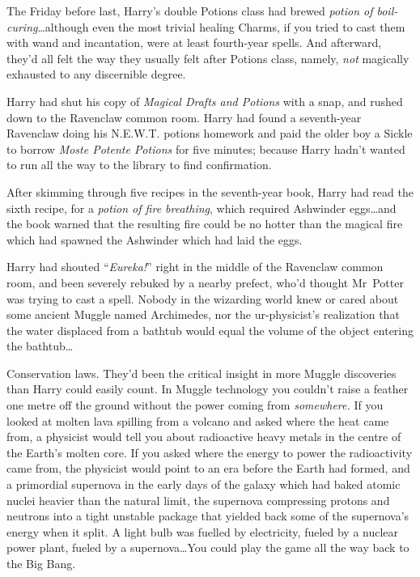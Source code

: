 The Friday before last, Harry’s double Potions class had brewed \emph{potion of boil-curing}…although even the most trivial healing Charms, if you tried to cast them with wand and incantation, were at least fourth-year spells. And afterward, they’d all felt the way they usually felt after Potions class, namely, \emph{not} magically exhausted to any discernible degree.

Harry had shut his copy of \emph{Magical Drafts and Potions} with a snap, and rushed down to the Ravenclaw common room. Harry had found a seventh-year Ravenclaw doing his N.E.W.T. potions homework and paid the older boy a Sickle to borrow \emph{Moste Potente Potions} for five minutes; because Harry hadn’t wanted to run all the way to the library to find confirmation.

After skimming through five recipes in the seventh-year book, Harry had read the sixth recipe, for a \emph{potion of fire breathing}, which required Ashwinder eggs…and the book warned that the resulting fire could be no hotter than the magical fire which had spawned the Ashwinder which had laid the eggs.

Harry had shouted “\emph{Eureka!}” right in the middle of the Ravenclaw common room, and been severely rebuked by a nearby prefect, who’d thought Mr~Potter was trying to cast a spell. Nobody in the wizarding world knew or cared about some ancient Muggle named Archimedes, nor the ur-physicist’s realization that the water displaced from a bathtub would equal the volume of the object entering the bathtub…

Conservation laws. They’d been the critical insight in more Muggle discoveries than Harry could easily count. In Muggle technology you couldn’t raise a feather one metre off the ground without the power coming from \emph{somewhere.} If you looked at molten lava spilling from a volcano and asked where the heat came from, a physicist would tell you about radioactive heavy metals in the centre of the Earth’s molten core. If you asked where the energy to power the radioactivity came from, the physicist would point to an era before the Earth had formed, and a primordial supernova in the early days of the galaxy which had baked atomic nuclei heavier than the natural limit, the supernova compressing protons and neutrons into a tight unstable package that yielded back some of the supernova’s energy when it split. A light bulb was fuelled by electricity, fueled by a nuclear power plant, fueled by a supernova…You could play the game all the way back to the Big Bang.

